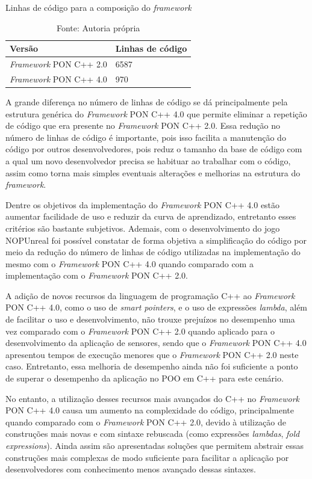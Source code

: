 \begin{table}[!htb]
\centering
\caption{Linhas de código para a composição do \textit{framework}}
\caption*{Fonte: Autoria própria}
\label{tab:linhas_de_codigo}
\smallskip
\begin{tabularx}{0.8\textwidth}{|X|X|}
\hline
Versão & Linhas de código\\
\hline
\textit{Framework} PON C++ 2.0 & 6587 \\
\hline
\textit{Framework} PON C++ 4.0 & 970 \\
\hline
\end{tabularx}
\end{table}

A grande diferença no número de linhas de código se dá principalmente pela
estrutura genérica do \textit{Framework} PON C++ 4.0 que permite eliminar a
repetição de código que era presente no \textit{Framework} PON C++ 2.0. Essa
redução no número de linhas de código é importante, pois isso facilita a
manutenção do código por outros desenvolvedores, pois reduz o tamanho da base de
código com a qual um novo desenvolvedor precisa se habituar ao trabalhar com o
código, assim como torna mais simples eventuais alterações e melhorias na
estrutura do \textit{framework}.

Dentre os objetivos da implementação do \textit{Framework} PON C++ 4.0 estão
aumentar facilidade de uso e reduzir da curva de aprendizado, entretanto esses
critérios são bastante subjetivos. Ademais, com o desenvolvimento do jogo
NOPUnreal foi possível constatar de forma objetiva a simplificação do código por
meio da redução do número de linhas de código utilizadas na implementação do
mesmo com o \textit{Framework} PON C++ 4.0 quando comparado com a implementação
com o \textit{Framework} PON C++ 2.0.

A adição de novos recursos da linguagem de programação C++ ao \textit{Framework}
PON C++ 4.0, como o uso de \textit{smart pointers}, e o uso de expressões
\textit{lambda}, além de facilitar o uso e desenvolvimento, não trouxe prejuízos
no desempenho uma vez comparado com o \textit{Framework} PON C++ 2.0 quando
aplicado para o desenvolvimento da aplicação de sensores, sendo que o
\textit{Framework} PON C++ 4.0 apresentou tempos de execução menores que o
\textit{Framework} PON C++ 2.0 neste caso. Entretanto, essa melhoria de
desempenho ainda não foi suficiente a ponto de superar o desempenho da aplicação
no POO em C++ para este cenário.

No entanto, a utilização desses recursos mais avançados do C++ no
\textit{Framework} PON C++ 4.0 causa um aumento na complexidade do código,
principalmente quando comparado com o \textit{Framework} PON C++ 2.0, devido à
utilização de construções mais novas e com sintaxe rebuscada (como expressões
\textit{lambdas}, \textit{fold expressions}). Ainda assim são apresentadas
soluções que permitem abstrair essas construções mais complexas de modo
suficiente para facilitar a aplicação por desenvolvedores com conhecimento menos
avançado dessas sintaxes.

